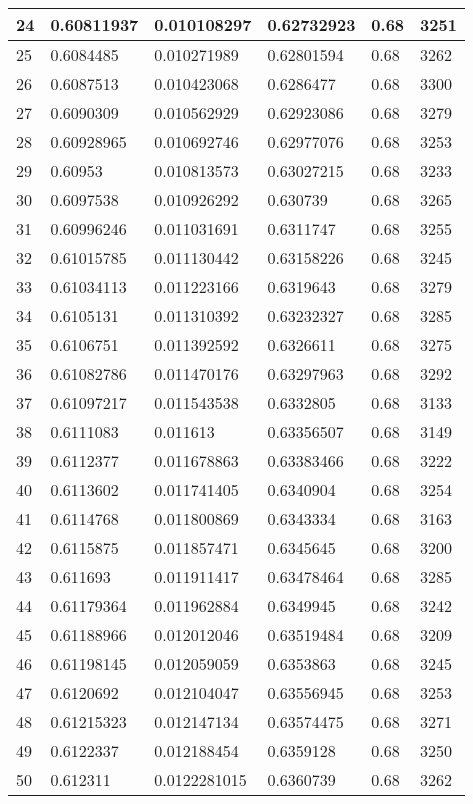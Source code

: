 \begin{longtable}{|l|l|l|l|l|l|}
24 & 0.60811937 & 0.010108297 & 0.62732923 & 0.68 & 3251 \\ \hline 
25 & 0.6084485 & 0.010271989 & 0.62801594 & 0.68 & 3262 \\ \hline 
26 & 0.6087513 & 0.010423068 & 0.6286477 & 0.68 & 3300 \\ \hline 
27 & 0.6090309 & 0.010562929 & 0.62923086 & 0.68 & 3279 \\ \hline 
28 & 0.60928965 & 0.010692746 & 0.62977076 & 0.68 & 3253 \\ \hline 
29 & 0.60953 & 0.010813573 & 0.63027215 & 0.68 & 3233 \\ \hline 
30 & 0.6097538 & 0.010926292 & 0.630739 & 0.68 & 3265 \\ \hline 
31 & 0.60996246 & 0.011031691 & 0.6311747 & 0.68 & 3255 \\ \hline 
32 & 0.61015785 & 0.011130442 & 0.63158226 & 0.68 & 3245 \\ \hline 
33 & 0.61034113 & 0.011223166 & 0.6319643 & 0.68 & 3279 \\ \hline 
34 & 0.6105131 & 0.011310392 & 0.63232327 & 0.68 & 3285 \\ \hline 
35 & 0.6106751 & 0.011392592 & 0.6326611 & 0.68 & 3275 \\ \hline 
36 & 0.61082786 & 0.011470176 & 0.63297963 & 0.68 & 3292 \\ \hline 
37 & 0.61097217 & 0.011543538 & 0.6332805 & 0.68 & 3133 \\ \hline 
38 & 0.6111083 & 0.011613 & 0.63356507 & 0.68 & 3149 \\ \hline 
39 & 0.6112377 & 0.011678863 & 0.63383466 & 0.68 & 3222 \\ \hline 
40 & 0.6113602 & 0.011741405 & 0.6340904 & 0.68 & 3254 \\ \hline 
41 & 0.6114768 & 0.011800869 & 0.6343334 & 0.68 & 3163 \\ \hline 
42 & 0.6115875 & 0.011857471 & 0.6345645 & 0.68 & 3200 \\ \hline 
43 & 0.611693 & 0.011911417 & 0.63478464 & 0.68 & 3285 \\ \hline 
44 & 0.61179364 & 0.011962884 & 0.6349945 & 0.68 & 3242 \\ \hline 
45 & 0.61188966 & 0.012012046 & 0.63519484 & 0.68 & 3209 \\ \hline 
46 & 0.61198145 & 0.012059059 & 0.6353863 & 0.68 & 3245 \\ \hline 
47 & 0.6120692 & 0.012104047 & 0.63556945 & 0.68 & 3253 \\ \hline 
48 & 0.61215323 & 0.012147134 & 0.63574475 & 0.68 & 3271 \\ \hline 
49 & 0.6122337 & 0.012188454 & 0.6359128 & 0.68 & 3250 \\ \hline 
50 & 0.612311 & 0.0122281015 & 0.6360739 & 0.68 & 3262 \\ \hline 
\end{longtable}